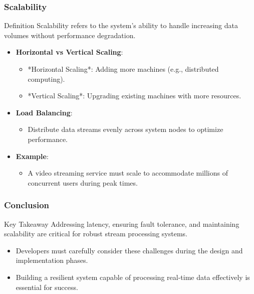 \documentclass[aspectratio=169]{beamer}
\begin{document}
\begin{frame}[fragile]
    \frametitle{Scalability}
    \begin{block}{Definition}
        Scalability refers to the system's ability to handle increasing data volumes without performance degradation.
    \end{block}
    \begin{itemize}
        \item \textbf{Horizontal vs Vertical Scaling}:
            \begin{itemize}
                \item *Horizontal Scaling*: Adding more machines (e.g., distributed computing).
                \item *Vertical Scaling*: Upgrading existing machines with more resources.
            \end{itemize}
        \item \textbf{Load Balancing}:
            \begin{itemize}
                \item Distribute data streams evenly across system nodes to optimize performance.
            \end{itemize}
        \item \textbf{Example}:
            \begin{itemize}
                \item A video streaming service must scale to accommodate millions of concurrent users during peak times.
            \end{itemize}
    \end{itemize}
\end{frame}

\begin{frame}[fragile]
    \frametitle{Conclusion}
    \begin{block}{Key Takeaway}
        Addressing latency, ensuring fault tolerance, and maintaining scalability are critical for robust stream processing systems. 
    \end{block}
    \begin{itemize}
        \item Developers must carefully consider these challenges during the design and implementation phases.
        \item Building a resilient system capable of processing real-time data effectively is essential for success.
    \end{itemize}
\end{frame}
\end{document}
